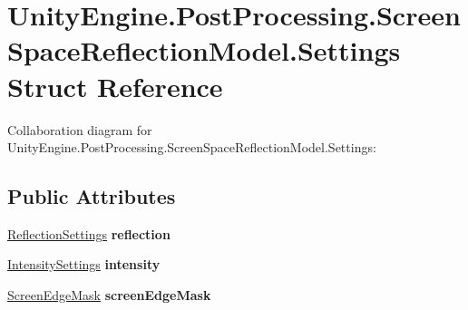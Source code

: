 \hypertarget{struct_unity_engine_1_1_post_processing_1_1_screen_space_reflection_model_1_1_settings}{}\section{Unity\+Engine.\+Post\+Processing.\+Screen\+Space\+Reflection\+Model.\+Settings Struct Reference}
\label{struct_unity_engine_1_1_post_processing_1_1_screen_space_reflection_model_1_1_settings}


Collaboration diagram for Unity\+Engine.\+Post\+Processing.\+Screen\+Space\+Reflection\+Model.\+Settings\+:
\subsection*{Public Attributes}
\begin{DoxyCompactItemize}
\item 
\mbox{\label{struct_unity_engine_1_1_post_processing_1_1_screen_space_reflection_model_1_1_settings_af5e50a060b8a92557f3b27f0ecbcf1f0}} 
\hyperlink{struct_unity_engine_1_1_post_processing_1_1_screen_space_reflection_model_1_1_reflection_settings}{Reflection\+Settings} {\bfseries reflection}
\item 
\mbox{\label{struct_unity_engine_1_1_post_processing_1_1_screen_space_reflection_model_1_1_settings_a379bc477aa7fa436d6838f6919017b2a}} 
\hyperlink{struct_unity_engine_1_1_post_processing_1_1_screen_space_reflection_model_1_1_intensity_settings}{Intensity\+Settings} {\bfseries intensity}
\item 
\mbox{\label{struct_unity_engine_1_1_post_processing_1_1_screen_space_reflection_model_1_1_settings_a3cb099eb427c211492d905039c26d337}} 
\hyperlink{struct_unity_engine_1_1_post_processing_1_1_screen_space_reflection_model_1_1_screen_edge_mask}{Screen\+Edge\+Mask} {\bfseries screen\+Edge\+Mask}
\end{DoxyCompactItemize}
